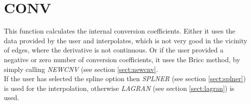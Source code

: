 \section{CONV}
\label{sect:conv}

\noindent This function calculates the internal conversion coefficients.
Either it uses the data provided by the user and interpolates, which is not
very good in the vicinity of edges, where the derivative is not continuous.
Or if the user provided a negative or zero number of conversion
coefficients, it uses the Bricc method, by simply calling {\em NEWCNV} (see
section \ref{sect:newcnv}.\\

\noindent If the user has selected the spline option then {\em SPLNER} (see
section \ref{sect:splner}) is used for the interpolation, otherwise {\em
LAGRAN} (see section \ref{sect:lagran}) is used.\\

